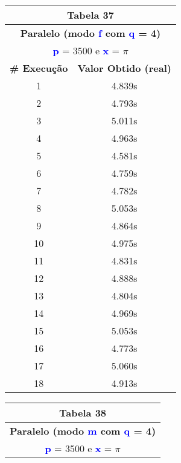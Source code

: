 \documentclass[11pt]{article}
\begin{document}
\begin{table}[!h]
	\begin{center}
		\begin{minipage}{0.48\textwidth}
			\begin{tabular}{| c | c |}
			\hline
			\multicolumn{2}{|c|}{\textbf{Tabela 37}} \\ \hline
			\multicolumn{2}{|c|}{\textbf{Paralelo (modo \textbf{\textcolor{blue}{f}} com \textbf{\textcolor{blue}{q}} = 4)}} \\
			\multicolumn{2}{|c|}{\textbf{\textcolor{blue}{p}} = 3500 e \textbf{\textcolor{blue}{x}} = $\pi$} \\ [0.2ex]
			\hline
				\textbf{\# Execução} &  \textbf{Valor Obtido (real)} \\ \hline
				1 & 4.839s \\ \hline
				2 & 4.793s \\ \hline
				3 & 5.011s \\ \hline
				4 & 4.963s \\ \hline
				5 & 4.581s \\ \hline
				6 & 4.759s \\ \hline
				7 & 4.782s \\ \hline
				8 & 5.053s \\ \hline
				9 & 4.864s \\ \hline
				10 & 4.975s \\ \hline
				11 & 4.831s \\ \hline
				12 & 4.888s \\ \hline
				13 & 4.804s \\ \hline
				14 & 4.969s \\ \hline
				15 & 5.053s \\ \hline
				16 & 4.773s \\ \hline
				17 & 5.060s \\ \hline
				18 & 4.913s \\ \hline
			\end{tabular}
		\end{minipage}
		\begin{minipage}{0.48\textwidth}
			\begin{tabular}{| c | c |}
			\hline
			\multicolumn{2}{|c|}{\textbf{Tabela 38}} \\ \hline
			\multicolumn{2}{|c|}{\textbf{Paralelo (modo \textbf{\textcolor{blue}{m}} com \textbf{\textcolor{blue}{q}} = 4)}} \\
			\multicolumn{2}{|c|}{\textbf{\textcolor{blue}{p}} = 3500 e \textbf{\textcolor{blue}{x}} = $\pi$} \\ [0.2ex]

\end{tabular}
\end{minipage}
\end{center}
\end{table}
\end{document}

